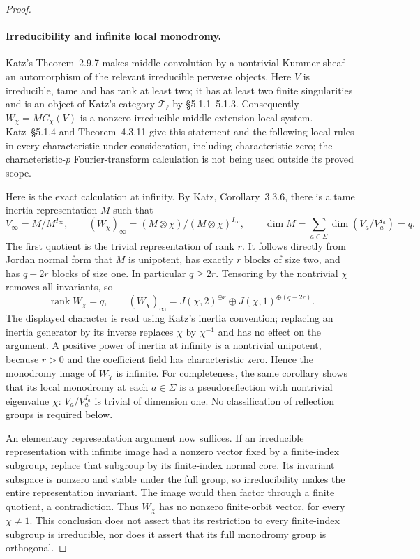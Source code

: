 \begin{proof}
\paragraph{Irreducibility and infinite local monodromy.}
Katz's Theorem~2.9.7 makes middle convolution by a nontrivial
Kummer sheaf an automorphism of the relevant irreducible
perverse objects. Here $V$ is irreducible, tame and has rank at
least two; it has at least two finite singularities and is an
object of Katz's category $\mathcal T_\ell$ by \S5.1.1--5.1.3.
Consequently $W_\chi=MC_\chi(V)$ is a nonzero irreducible
middle-extension local system. Katz~\S5.1.4 and Theorem~4.3.11
give this statement and the following local rules in every
characteristic under consideration, including characteristic
zero; the characteristic-$p$ Fourier-transform calculation is
not being used outside its proved scope.

Here is the exact calculation at infinity. By Katz,
Corollary~3.3.6, there is a tame inertia representation $M$ such
that
\[
 V_\infty=M/M^{I_\infty},\qquad
 (W_\chi)_\infty=(M\otimes\chi)/(M\otimes\chi)^{I_\infty},
 \qquad
 \dim M=\sum_{a\in\Sigma}\dim(V_a/V_a^{I_a})=q.
                                                               \tag{H9.97}
\]
The first quotient is the trivial representation of rank $r$.
It follows directly from Jordan normal form that $M$ is
unipotent, has exactly $r$ blocks of size two, and has $q-2r$
blocks of size one. In particular $q\ge2r$. Tensoring by the
nontrivial $\chi$ removes all invariants, so
\[
 \operatorname{rank}W_\chi=q,\qquad
 (W_\chi)_\infty
       =J(\chi,2)^{\oplus r}\oplus
                            J(\chi,1)^{\oplus(q-2r)}.
                                                               \tag{H9.98}
\]
The displayed character is read using Katz's inertia convention;
replacing an inertia generator by its inverse replaces $\chi$
by $\chi^{-1}$ and has no effect on the argument. A positive
power of inertia at infinity is a nontrivial unipotent, because
$r>0$ and the coefficient field has characteristic zero. Hence
the monodromy image of $W_\chi$ is infinite. For completeness,
the same corollary shows that its local monodromy at each
$a\in\Sigma$ is a pseudoreflection with nontrivial eigenvalue
$\chi$: $V_a/V_a^{I_a}$ is trivial of dimension one. No
classification of reflection groups is required below.

An elementary representation argument now suffices. If an
irreducible representation with infinite image had a nonzero
vector fixed by a finite-index subgroup, replace that subgroup
by its finite-index normal core. Its invariant subspace is
nonzero and stable under the full group, so irreducibility
makes the entire representation invariant. The image would
then factor through a finite quotient, a contradiction. Thus
$W_\chi$ has no nonzero finite-orbit vector, for every
$\chi\ne1$. This conclusion does not assert that its
restriction to every finite-index subgroup is irreducible, nor
does it assert that its full monodromy group is orthogonal.


\end{proof}

